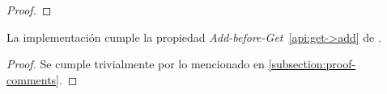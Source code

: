 \begin{proof}


\end{proof}

\begin{lemma}
  La implementación \hashchain cumple la propiedad \textit{Add-before-Get}~\ref{api:get->add} de \setchain.
\end{lemma}

\begin{proof}
  Se cumple trivialmente por lo mencionado en \ref{subsection:proof-comments}.
\end{proof}

